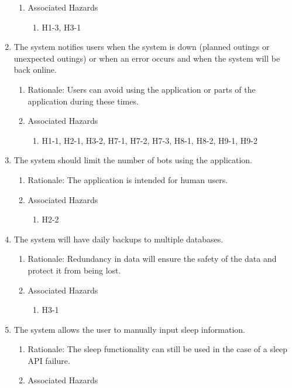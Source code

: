 \documentclass{article}
\begin{document}
\begin{enumerate}
\begin{enumerate}
		\item Associated Hazards
		\begin{enumerate}
			\item H1-3, H3-1
		\end{enumerate}
	\end{enumerate} 
	\item The system notifies users when the system is down (planned outings or unexpected outings) or when an error occurs and when the system will be back online. 
	\begin{enumerate}
		\item Rationale: Users can avoid using the application or parts of the application during these times. 
		\item Associated Hazards
		\begin{enumerate}
			\item H1-1, H2-1, H3-2, H7-1, H7-2, H7-3, H8-1, H8-2, H9-1, H9-2
		\end{enumerate}
	\end{enumerate}
	\item The system should limit the number of bots using the application.
	\begin{enumerate}
		\item Rationale: The application is intended for human users.
		\item Associated Hazards
		\begin{enumerate}
			\item H2-2
		\end{enumerate}
	\end{enumerate}
	\item The system will have daily backups to multiple databases.
	\begin{enumerate}
		\item Rationale: Redundancy in data will ensure the safety of the data and protect it from being lost.
		\item Associated Hazards
		\begin{enumerate}
			\item H3-1
		\end{enumerate}
	\end{enumerate}
	\item The system allows the user to manually input sleep information.
	\begin{enumerate}
		\item Rationale: The sleep functionality can still be used in the case of a sleep API failure.
		\item Associated Hazards

\end{enumerate}
\end{enumerate}
\end{document}
